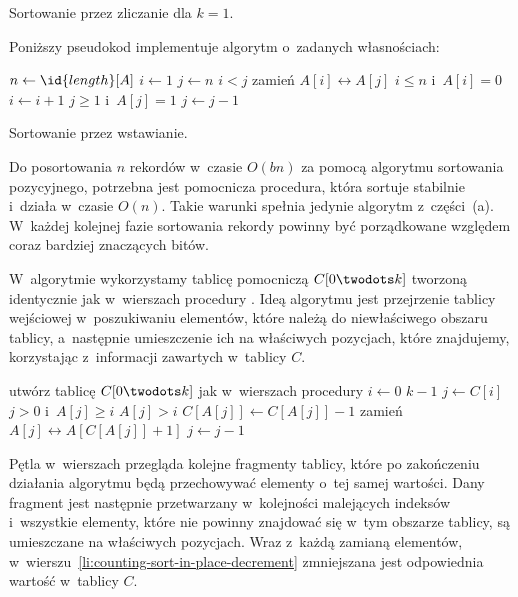 
\subproblem %
Sortowanie przez zliczanie dla $k=1$.

\subproblem %
Poniższy pseudokod implementuje algorytm o~zadanych własnościach:
\begin{codebox}
\li	$n\gets\id{length}[A]$
\li	$i\gets1$
\li	$j\gets n$
\li	\While $i<j$
\li		\Do
			zamień $A[i]\leftrightarrow A[j]$
\li			\While $i\le n$ i~$A[i]=0$
\li				\Do $i\gets i+1$
				\End
\li			\While $j\ge1$ i~$A[j]=1$
\li				\Do $j\gets j-1$
				\End
		\End
\end{codebox}

\subproblem %
Sortowanie przez wstawianie.

\subproblem %
Do posortowania $n$ rekordów  w~czasie $O(bn)$ za pomocą algorytmu sortowania pozycyjnego, potrzebna jest pomocnicza procedura, która sortuje stabilnie i~działa w~czasie $O(n)$. Takie warunki spełnia jedynie algorytm z~części~(a). W~każdej kolejnej fazie sortowania rekordy powinny być porządkowane względem coraz bardziej znaczących bitów.

\subproblem %
W~algorytmie wykorzystamy tablicę pomocniczą $C[0\twodots k]$ tworzoną identycznie jak w~wierszach  procedury . Ideą algorytmu jest przejrzenie tablicy wejściowej w~poszukiwaniu elementów, które należą do niewłaściwego obszaru tablicy, a~następnie umieszczenie ich na właściwych pozycjach, które znajdujemy, korzystając z~informacji zawartych w~tablicy $C$.
\begin{codebox}
\li	utwórz tablicę $C[0\twodots k]$ jak w~wierszach  procedury  
\li	\For $i\gets0$ \To $k-1$ \label{li:counting-sort-in-place-for-begin}
\li		\Do
			$j\gets C[i]$
\li			\While $j>0$ i~$A[j]\ge i$ \label{li:counting-sort-in-place-while1-begin}
\li				\Do
					\While $A[j]>i$
\li						\Do
							$C[A[j]]\gets C[A[j]]-1$ \label{li:counting-sort-in-place-decrement}
\li							zamień $A[j]\leftrightarrow A[C[A[j]]+1]$ \label{li:counting-sort-in-place-swap}
						\End
\li					$j\gets j-1$
				\End \label{li:counting-sort-in-place-while1-end}
		\End \label{li:counting-sort-in-place-for-end}
\end{codebox}

Pętla  w~wierszach \twodashes{\ref{li:counting-sort-in-place-for-begin}}{\ref{li:counting-sort-in-place-for-end}} przegląda kolejne fragmenty tablicy, które po zakończeniu działania algorytmu będą przechowywać elementy o~tej samej wartości. Dany fragment jest następnie przetwarzany w~kolejności malejących indeksów i~wszystkie elementy, które nie powinny znajdować się w~tym obszarze tablicy, są umieszczane na właściwych pozycjach. Wraz z~każdą zamianą elementów, w~wierszu~\ref{li:counting-sort-in-place-decrement} zmniejszana jest odpowiednia wartość w~tablicy $C$.

